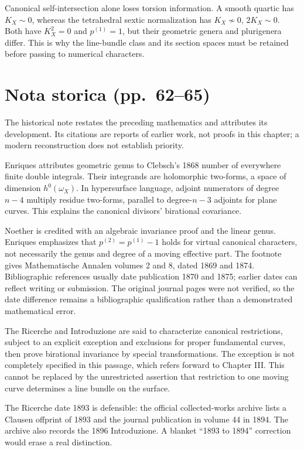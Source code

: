 Canonical self-intersection alone loses torsion information. A smooth quartic has \(K_X\sim0\), whereas the tetrahedral sextic normalization has \(K_X\not\sim0\), \(2K_X\sim0\). Both have \(K_X^2=0\) and \(p^{(1)}=1\), but their geometric genera and plurigenera differ. This is why the line-bundle class and its section spaces must be retained before passing to numerical characters.

\section[Nota storica]{Nota storica (pp.~62--65)}\label{commentary-II-9}

The historical note restates the preceding mathematics and attributes its development. Its citations are reports of earlier work, not proofs in this chapter; a modern reconstruction does not establish priority.

Enriques attributes geometric genus to Clebsch's 1868 number of everywhere finite double integrals. Their integrands are holomorphic two-forms, a space of dimension \(h^0(\omega_X)\). In hypersurface language, adjoint numerators of degree \(n-4\) multiply residue two-forms, parallel to degree-\(n-3\) adjoints for plane curves. This explains the canonical divisors' birational covariance.

Noether is credited with an algebraic invariance proof and the linear genus. Enriques emphasizes that \(p^{(2)}=p^{(1)}-1\) holds for virtual canonical characters, not necessarily the genus and degree of a moving effective part. The footnote gives Mathematische Annalen volumes 2 and 8, dated 1869 and 1874. Bibliographic references usually date publication 1870 and 1875; earlier dates can reflect writing or submission. The original journal pages were not verified, so the date difference remains a bibliographic qualification rather than a demonstrated mathematical error.

The Ricerche and Introduzione are said to characterize canonical restrictions, subject to an explicit exception and exclusions for proper fundamental curves, then prove birational invariance by special transformations. The exception is not completely specified in this passage, which refers forward to Chapter III. This cannot be replaced by the unrestricted assertion that restriction to one moving curve determines a line bundle on the surface.

The Ricerche date 1893 is defensible: the official collected-works archive lists a Clausen offprint of 1893 and the journal publication in volume 44 in 1894. The archive also records the 1896 Introduzione. A blanket ``1893 to 1894'' correction would erase a real distinction.

